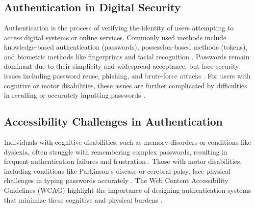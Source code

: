 \chapter{}%
\label{ch:stand-van-zaken}




\section{Authentication in Digital Security}
Authentication is the process of verifying the identity of users attempting to access digital systems or online services. 
Commonly used methods include knowledge-based authentication (passwords), possession-based methods (tokens), and 
biometric methods like fingerprints and facial recognition \autocite{Pant2022}. Passwords remain dominant due to 
their simplicity and widespread acceptance, but face security issues including password reuse, phishing, and 
brute-force attacks \autocite{Ophoff2021}. For users with cognitive or motor disabilities, these issues are 
further complicated by difficulties in recalling or accurately inputting passwords \autocite{Rochford2014}.

\section{Accessibility Challenges in Authentication}
Individuals with cognitive disabilities, such as memory disorders or conditions like dyslexia, often struggle with remembering complex passwords, resulting in frequent authentication failures and frustration \autocite{Farid2019, Ophoff2021}. Those with motor disabilities, including conditions like Parkinson's disease or cerebral palsy, face physical challenges in typing passwords accurately \autocite{Renaud2020}. The Web Content Accessibility Guidelines (WCAG) highlight the importance of designing authentication systems that minimize these cognitive and physical burdens \autocite{Brewer2023}.

\clearpage

